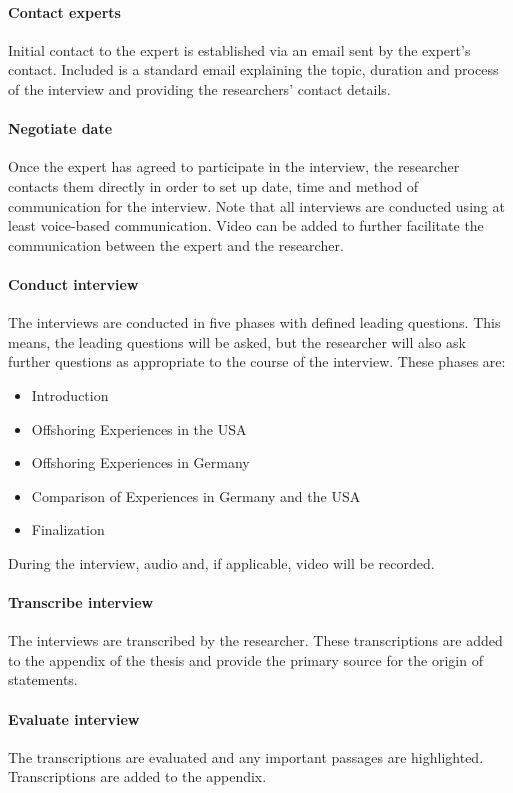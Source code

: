 \paragraph{Contact experts} Initial contact to the expert is established via an email sent by the expert's contact. Included is a standard email explaining the topic, duration and process of the interview and providing the researchers' contact details.
\paragraph{Negotiate date} Once the expert has agreed to participate in the interview, the researcher contacts them directly in order to set up date, time and method of communication for the interview. Note that all interviews are conducted using at least voice-based communication. Video can be added to further facilitate the communication between the expert and the researcher.
\paragraph{Conduct interview} The interviews are conducted in five phases with defined leading questions. This means, the leading questions will be asked, but the researcher will also ask further questions as appropriate to the course of the interview. These phases are:
\begin{itemize}
	\item Introduction
	\item Offshoring Experiences in the USA
	\item Offshoring Experiences in Germany
	\item Comparison of Experiences in Germany and the USA
	\item Finalization
\end{itemize}
During the interview, audio and, if applicable, video will be recorded.

\paragraph{Transcribe interview} The interviews are transcribed by the researcher. These transcriptions are added to the appendix of the thesis and provide the primary source for the origin of statements.

\paragraph{Evaluate interview} The transcriptions are evaluated and any important passages are highlighted. Transcriptions are added to the appendix.

